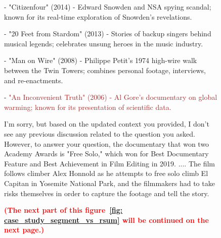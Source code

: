 \begin{figure}[htb]
\begin{tcolorbox}[left=3pt,right=3pt,top=3pt,bottom=3pt,title=\textbf{Memory generated by RecurSum~\citep{wang2023recursively}:}]
-  "Citizenfour" (2014) - Edward Snowden and NSA spying scandal; known for its real-time exploration of Snowden's revelations.

-  "20 Feet from Stardom" (2013) - Stories of backup singers behind musical legends; celebrates unsung heroes in the music industry.

-  "Man on Wire" (2008) - Philippe Petit's 1974 high-wire walk between the Twin Towers; combines personal footage, interviews, and re-enactments.

-  \textcolor{brown}{"An Inconvenient Truth" (2006) - Al Gore's documentary on global warming; known for its presentation of scientific data.}
\end{tcolorbox}
\begin{tcolorbox}[left=3pt,right=3pt,top=3pt,bottom=3pt,title=\textbf{Answer (RSum):}]
I'm sorry, but based on the updated context you provided, I don't see any previous discussion related to the question you asked. However, to answer your question, the documentary that won two Academy Awards is "Free Solo," which won for Best Documentary Feature and Best Achievement in Film Editing in 2019. 
....
The film follows climber Alex Honnold as he attempts to free solo climb El Capitan in Yosemite National Park, and the filmmakers had to take risks themselves in order to capture the footage and tell the story.

\textbf{\textcolor{red}{(The next part of this figure~\ref{fig: case_study_segment_vs_rsum} will be continued on the next page.)}}
\end{tcolorbox}
\end{figure}
